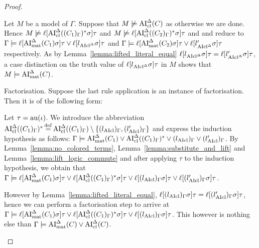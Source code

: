 \documentclass[,%
	draft=false,%
	numbers=noendperiod
	11pt,
	a4paper,
	oneside,%
	openany,
]{memoir}
\begin{document}
\begin{proof}
\begin{description}
\begin{enumerate}
					Let $M$ be a model of $\Gamma$. Suppose that $M \not\models \operatorname{AI}_\mathrm{cl}^\Delta(C)$ as otherwise we are done. Hence $M \not\models \ell[\operatorname{AI}_\mathrm{cl}^\Delta((C_1)_\Gamma)^*\sigma]\tau$ and $M \not\models \ell[\operatorname{AI}_\mathrm{cl}^\Delta((C_2)_\Gamma)^*\sigma]\tau$ and \markA{} and \markB{} reduce to
					$\Gamma \models \ell[\operatorname{AI}_\mathrm{mat}^\Delta(C_1)\sigma]\tau \lor \ell[l{_{\operatorname{AIcl}^\Delta}}\sigma]\tau$
					and
					$\Gamma \models \ell[\operatorname{AI}_\mathrm{mat}^\Delta(C_2)\sigma]\tau \lor \ell[l{_{\operatorname{AIcl}^\Delta}'}\sigma]\tau$ respectively.
					As by Lemma~\ref{lemma:lifted_literal_equal} $\ell[l{_{\operatorname{AIcl}^\Delta}}\sigma]\tau = \ell[l{_{\operatorname{AIcl}^\Delta}'}\sigma]\tau$, a case distinction on the truth value of $\ell[l{_{\operatorname{AIcl}^\Delta}}\sigma]\tau$ in $M$ shows that $M\models \operatorname{AI}_\mathrm{mat}^\Delta(C)$.


			\end{enumerate}



		\item{Factorisation.}
			Suppose the last rule application is an instance of factorisation. Then it is of the following form:
			\begin{prooftree}
			\end{prooftree}

			Let $\tau = \operatorname{au}(\iota)$.
			We introduce the abbreviation $\operatorname{AI}_\mathrm{cl}^\Delta( (C_1)_\Gamma)^* \operatorname{\stackrel{\mathrm{def}}{=}} \operatorname{AI}_\mathrm{cl}^\Delta( (C_1)_\Gamma) \setminus \{ (l_{\operatorname{AIcl}})_\Gamma , (l'_{\operatorname{AIcl}})_\Gamma \}$ and express the induction hypothesis as follows:
			$\Gamma \models \operatorname{AI}_\mathrm{mat}^\Delta(C_1) \lor \operatorname{AI}_\mathrm{cl}^\Delta( (C_1)_\Gamma)^* \lor (l_{\operatorname{AIcl}})_\Gamma \lor (l'_{\operatorname{AIcl}})_\Gamma $.
			By Lemma~\ref{lemma:no_colored_terms}, Lemma~\ref{lemma:substitute_and_lift} and Lemma~\ref{lemma:lift_logic_commute} and after applying $\tau$ to the induction hypothesis, we obtain that
			$\Gamma \models \ell[\operatorname{AI}_\mathrm{mat}^\Delta(C_1)\sigma]\tau \lor \ell[\operatorname{AI}_\mathrm{cl}^\Delta( (C_1)_\Gamma)^*\sigma]\tau \lor \ell[(l_{\operatorname{AIcl}})_\Gamma \sigma]\tau \lor \ell[(l'_{\operatorname{AIcl}})_\Gamma\sigma]\tau $.

			However by Lemma~\ref{lemma:lifted_literal_equal},
			$\ell[(l_{\operatorname{AIcl}})_\Gamma\sigma]\tau =
			\ell[(l'_{\operatorname{AIcl}})_\Gamma\sigma]\tau$, hence we can perform a factorisation step to arrive at
			$\Gamma \models \ell[\operatorname{AI}_\mathrm{mat}^\Delta(C_1)\sigma]\tau \lor \ell[\operatorname{AI}_\mathrm{cl}^\Delta( (C_1)_\Gamma)^*\sigma]\tau \lor \ell[(l_{\operatorname{AIcl}})_\Gamma \sigma]\tau$.
			This however is nothing else than $\Gamma\models \operatorname{AI}_\mathrm{mat}^\Delta(C) \lor \operatorname{AI}_\mathrm{cl}^\Delta(C)$.
			\qedhere
	\end{description}
\end{proof}
\end{document}
